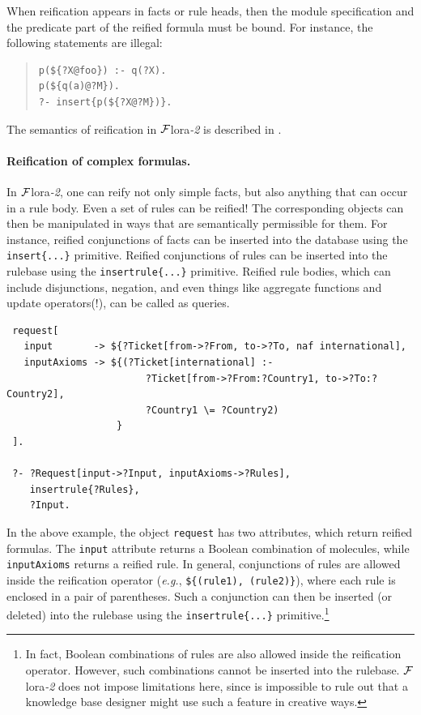 \documentclass[11pt]{article}
\newcommand{\FLORA}{{\mbox{\sc ${\cal F}${lora}\rm\emph{-2}}}\xspace}
\begin{document}
When reification appears in facts or rule heads, then the module
specification and the predicate part of the reified formula must be bound.
For instance, the following statements are illegal:
\begin{quote}
\begin{verbatim}
p(${?X@foo}) :- q(?X).
p(${q(a)@?M}).
?- insert{p(${?X@?M})}. 
\end{verbatim}
\end{quote}

\noindent
The semantics of reification in \FLORA is described in
\cite{reification-data-semantics-03}.

\paragraph{Reification of complex formulas.}
In \FLORA, one can reify not only simple facts, but also anything that
can occur in a rule body. Even a set of rules can be reified!
The corresponding objects can then be manipulated in ways that are semantically
permissible for them. For instance, reified conjunctions of facts can be
inserted into the database using the \verb|insert{...}| primitive. 
Reified conjunctions of rules can be inserted into the rulebase using the
\verb|insertrule{...}| primitive. Reified rule bodies, which can include
disjunctions, negation, and even things like aggregate functions and update
operators(!), can be called as queries.
\begin{verbatim}
 request[
   input       -> ${?Ticket[from->?From, to->?To, naf international],
   inputAxioms -> ${(?Ticket[international] :-
                        ?Ticket[from->?From:?Country1, to->?To:?Country2],
                        ?Country1 \= ?Country2)
                   }
 ].

 ?- ?Request[input->?Input, inputAxioms->?Rules],
    insertrule{?Rules},
    ?Input.
\end{verbatim}

In the above example, the object {\tt request} has two attributes, which
return reified formulas. The {\tt input} attribute returns a Boolean
combination of molecules, while {\tt inputAxioms} returns a reified rule.
In general, conjunctions of rules are allowed inside the reification
operator ({\it e.g.}, \verb|${(rule1), (rule2)}|), where each rule is
enclosed in a pair of parentheses. Such a conjunction can then be inserted
(or deleted) into the rulebase using the {\tt insertrule\{...\}}
primitive.\footnote{
  In fact, Boolean combinations of rules are also allowed inside the
  reification operator. However, such combinations cannot be inserted into
  the rulebase. \FLORA does not impose limitations here, since is
  impossible to rule out that a knowledge base designer might use such a
  feature in creative ways.
}
\end{document}

